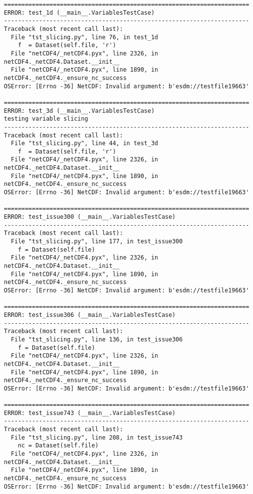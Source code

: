 \begin{verbatim}
======================================================================
ERROR: test_1d (__main__.VariablesTestCase)
----------------------------------------------------------------------
Traceback (most recent call last):
  File "tst_slicing.py", line 76, in test_1d
    f  = Dataset(self.file, 'r')
  File "netCDF4/_netCDF4.pyx", line 2326, in netCDF4._netCDF4.Dataset.__init__
  File "netCDF4/_netCDF4.pyx", line 1890, in netCDF4._netCDF4._ensure_nc_success
OSError: [Errno -36] NetCDF: Invalid argument: b'esdm://testfile19663'

======================================================================
ERROR: test_3d (__main__.VariablesTestCase)
testing variable slicing
----------------------------------------------------------------------
Traceback (most recent call last):
  File "tst_slicing.py", line 44, in test_3d
    f  = Dataset(self.file, 'r')
  File "netCDF4/_netCDF4.pyx", line 2326, in netCDF4._netCDF4.Dataset.__init__
  File "netCDF4/_netCDF4.pyx", line 1890, in netCDF4._netCDF4._ensure_nc_success
OSError: [Errno -36] NetCDF: Invalid argument: b'esdm://testfile19663'

======================================================================
ERROR: test_issue300 (__main__.VariablesTestCase)
----------------------------------------------------------------------
Traceback (most recent call last):
  File "tst_slicing.py", line 177, in test_issue300
    f = Dataset(self.file)
  File "netCDF4/_netCDF4.pyx", line 2326, in netCDF4._netCDF4.Dataset.__init__
  File "netCDF4/_netCDF4.pyx", line 1890, in netCDF4._netCDF4._ensure_nc_success
OSError: [Errno -36] NetCDF: Invalid argument: b'esdm://testfile19663'

======================================================================
ERROR: test_issue306 (__main__.VariablesTestCase)
----------------------------------------------------------------------
Traceback (most recent call last):
  File "tst_slicing.py", line 136, in test_issue306
    f = Dataset(self.file)
  File "netCDF4/_netCDF4.pyx", line 2326, in netCDF4._netCDF4.Dataset.__init__
  File "netCDF4/_netCDF4.pyx", line 1890, in netCDF4._netCDF4._ensure_nc_success
OSError: [Errno -36] NetCDF: Invalid argument: b'esdm://testfile19663'

======================================================================
ERROR: test_issue743 (__main__.VariablesTestCase)
----------------------------------------------------------------------
Traceback (most recent call last):
  File "tst_slicing.py", line 208, in test_issue743
    nc = Dataset(self.file)
  File "netCDF4/_netCDF4.pyx", line 2326, in netCDF4._netCDF4.Dataset.__init__
  File "netCDF4/_netCDF4.pyx", line 1890, in netCDF4._netCDF4._ensure_nc_success
OSError: [Errno -36] NetCDF: Invalid argument: b'esdm://testfile19663'


\end{verbatim}
